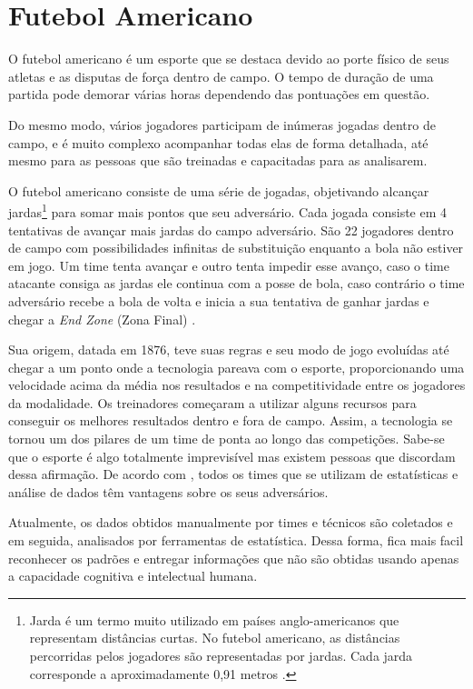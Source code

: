 \section{\textbf{{Futebol Americano}}}
\label{futebol-americano}

O futebol americano é um esporte que se destaca devido ao porte físico de seus atletas e as disputas de força dentro de campo. O tempo de duração de uma partida pode demorar várias horas dependendo das pontuações em questão.

Do mesmo modo, vários jogadores participam de inúmeras jogadas dentro de campo, e é muito complexo acompanhar todas elas de forma detalhada, até mesmo para as pessoas que são treinadas e capacitadas para as analisarem.

O futebol americano consiste de uma série de jogadas, objetivando alcançar jardas\footnote{Jarda é um termo muito utilizado em países anglo-americanos que representam distâncias curtas. No futebol americano, as distâncias percorridas pelos jogadores são representadas por jardas. Cada jarda corresponde a aproximadamente 0,91 metros \cite{BRASILESCOLA2019}.\label{Jardas}} para somar mais pontos que seu adversário. Cada jogada consiste em 4 tentativas de avançar mais jardas do campo adversário. São 22 jogadores dentro de campo com possibilidades infinitas de substituição enquanto a bola não estiver em jogo. Um time tenta avançar e outro tenta impedir esse avanço, caso o time atacante consiga as jardas ele continua com a posse de bola, caso contrário o time adversário recebe a bola de volta e inicia a sua tentativa de ganhar jardas e chegar a \textit{End Zone} (Zona Final) \cite{NFL2019}.

Sua origem, datada em 1876, teve suas regras e seu modo de jogo evoluídas até chegar a um ponto onde a tecnologia pareava com o esporte, proporcionando uma velocidade acima da média nos resultados e na competitividade entre os jogadores da modalidade. Os treinadores começaram a utilizar alguns recursos para conseguir os melhores resultados dentro e fora de campo. Assim, a tecnologia se tornou um dos pilares de um time de ponta ao longo das competições. Sabe-se que o esporte é algo totalmente imprevisível mas existem pessoas que discordam dessa afirmação. De acordo com , todos os times que se utilizam de estatísticas e análise de dados têm vantagens sobre os seus adversários.

Atualmente, os dados obtidos manualmente por times e técnicos são coletados e em seguida, analisados por ferramentas de estatística. Dessa forma, fica mais facil reconhecer os padrões e entregar informações que não são obtidas usando apenas a capacidade cognitiva e intelectual humana.

